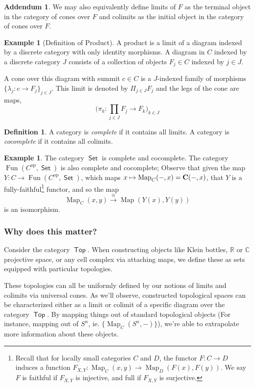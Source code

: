 \documentclass[leqno, openany]{memoir}
\theoremstyle{definition}
\newtheorem{defn}[thm]{Definition}
\newtheorem{exm}[thm]{Example}
\theoremstyle{remark}
\theoremstyle{plain}
\theoremstyle{definition}
\newtheorem*{addm*}{Addendum}
\theoremstyle{remark}
\newcommand{\R}{\mathbb{R}}
\newcommand{\C}{\mathbb{C}}
\newcommand{\iso}{\cong}
\newcommand{\opp}{^\text{op}}
\DeclareMathOperator{\Top}{\mathsf{Top}}
\DeclareMathOperator{\Sets}{\mathsf{Set}}
\DeclareMathOperator{\Map}{Map}
\DeclareMathOperator{\Fun}{Fun}
\begin{document}
\begin{addm*}
    We may also equivalently define limits of $F$ as the terminal object in the category of cones over $F$ and colimits as the initial object in the category of cones over $F$.
\end{addm*}

\begin{exm}[Definition of Product]
    A product is a limit of a diagram indexed by a discrete category with only identity morphisms. A diagram in $C$ indexed by a discrete category $J$ consists of a collection of objects $F_j \in C$ indexed by $j \in J$.
    
    A cone over this diagram with summit $c \in C$ is a $J$-indexed family of morphisms $\{\lambda_j: c \to F_j\}_{j \in J}$. This limit is denoted by $\Pi_{j\in J} F_j$ and the legs of the cone are maps,
    \[\bigg(\pi_k: \prod_{j \in J} F_j \to F_k \bigg)_{k \in J}\]
\end{exm}

\begin{defn}
    A category is \emph{complete} if it contains all limits. A category is \emph{cocomplete} if it contains all colimits.
\end{defn}

\begin{exm}
    The category $\Sets$ is complete and cocomplete. The category $\Fun(C\opp, \Sets)$ is also complete and cocomplete; Observe that given the map $Y: C \to \Fun(C\opp, \Sets)$, which maps $x \mapsto \Map_C(-,x) = \bold{C}(-,x)$, that $Y$ is a fully-faithful\footnote{Recall that for locally small categories $C$ and $D$, the functor $F: C \to D$ induces a function $F_{X,Y}:  \Map_C(x,y) \to \Map_D(F(x), F(y))$. We say $F$ is faithful if $F_{X,Y}$ is injective, and full if $F_{X,Y}$ is surjective.} functor, and so the map 
    \[\Map_C(x,y) \xrightarrow{\iso} \Map(Y(x), Y(y))\]
    is an isomorphism.
\end{exm}

\subsubsection{Why does this matter?}
Consider the category $\Top$. When constructing objects like Klein bottles, $\R$ or $\C$ projective space, or any cell complex via attaching maps, we define these as sets equipped with particular topologies. 

These topologies can all be uniformly defined by our notions of limits and colimits via universal cones. As we'll observe, constructed topological spaces can be characterized either as a limit or colimit of a specific diagram over the category $\Top$. By mapping things out of standard topological objects (For instance, mapping out of $S^n$, ie. $\{\Map_C(S^n, -)\}$), we're able to extrapolate more information about these objects.
\end{document}
